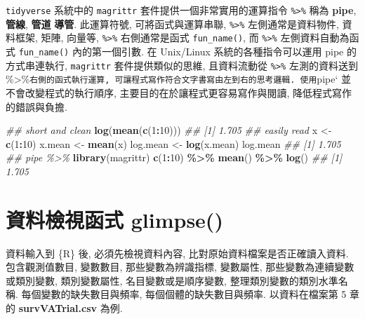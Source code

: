 \documentclass[
]{book}
\newenvironment{Shaded}{\begin{snugshade}}{\end{snugshade}}
\newcommand{\CommentTok}[1]{\textcolor[rgb]{0.56,0.35,0.01}{\textit{#1}}}
\newcommand{\DecValTok}[1]{\textcolor[rgb]{0.00,0.00,0.81}{#1}}
\newcommand{\KeywordTok}[1]{\textcolor[rgb]{0.13,0.29,0.53}{\textbf{#1}}}
\newcommand{\NormalTok}[1]{#1}
\newcommand{\OperatorTok}[1]{\textcolor[rgb]{0.81,0.36,0.00}{\textbf{#1}}}
\newcommand{\StringTok}[1]{\textcolor[rgb]{0.31,0.60,0.02}{#1}}
\begin{document}
\texttt{tidyverse} 系統中的 \texttt{magrittr} 套件提供一個非常實用的運算指令
\texttt{\%\textgreater{}\%} 稱為 \textbf{pipe}, \textbf{管線}, \textbf{管道} \textbf{導管}.
此運算符號, 可將函式與運算串聯,
\texttt{\%\textgreater{}\%} 左側通常是資料物件, 資料框架, 矩陣, 向量等,
\texttt{\%\textgreater{}\%} 右側通常是函式 \texttt{fun\_name()},
而 \texttt{\%\textgreater{}\%} 左側資料自動為函式 \texttt{fun\_name()} 內的第一個引數.
在 Unix/Linux 系統的各種指令可以運用 pipe 的方式串連執行,
\texttt{magrittr} 套件提供類似的思維,
且資料流動從 \texttt{\%\textgreater{}\%} 左測的資料送到 \%\textgreater\%\texttt{右側的函式執行運算,\ 可讓程式寫作符合文字書寫由左到右的思考邏輯.\ 使用}pipe` 並不會改變程式的執行順序,
主要目的在於讓程式更容易寫作與閱讀,
降低程式寫作的錯誤與負擔.

\begin{Shaded}
\begin{Highlighting}[]
\CommentTok{\#\# short and clean }
\KeywordTok{log}\NormalTok{(}\KeywordTok{mean}\NormalTok{(}\KeywordTok{c}\NormalTok{(}\DecValTok{1}\OperatorTok{:}\DecValTok{10}\NormalTok{)))}
\CommentTok{\#\# [1] 1.705}
\CommentTok{\#\# easily read }
\NormalTok{x \textless{}{-}}\StringTok{ }\KeywordTok{c}\NormalTok{(}\DecValTok{1}\OperatorTok{:}\DecValTok{10}\NormalTok{)}
\NormalTok{x.mean \textless{}{-}}\StringTok{ }\KeywordTok{mean}\NormalTok{(x)}
\NormalTok{log.mean \textless{}{-}}\StringTok{ }\KeywordTok{log}\NormalTok{(x.mean)}
\NormalTok{log.mean}
\CommentTok{\#\# [1] 1.705}
\CommentTok{\#\# pipe \%\textgreater{}\%}
\KeywordTok{library}\NormalTok{(magrittr)}
\KeywordTok{c}\NormalTok{(}\DecValTok{1}\OperatorTok{:}\DecValTok{10}\NormalTok{) }\OperatorTok{\%\textgreater{}\%}\StringTok{ }\KeywordTok{mean}\NormalTok{() }\OperatorTok{\%\textgreater{}\%}\StringTok{ }\KeywordTok{log}\NormalTok{()}
\CommentTok{\#\# [1] 1.705}
\end{Highlighting}
\end{Shaded}

\hypertarget{ux8cc7ux6599ux6aa2ux8996ux51fdux5f0f-glimpse}{%
\section{資料檢視函式 glimpse()}\label{ux8cc7ux6599ux6aa2ux8996ux51fdux5f0f-glimpse}}

資料輸入到 \{R\} 後,
必須先檢視資料內容, 比對原始資料檔案是否正確讀入資料.
包含觀測值數目, 變數數目,
那些變數為辨識指標,
變數屬性, 那些變數為連續變數或類別變數,
類別變數屬性, 名目變數或是順序變數,
整理類別變數的類別水準名稱.
每個變數的缺失數目與頻率,
每個個體的缺失數目與頻率.
以資料在檔案第 5 章的 \textbf{survVATrial.csv} 為例.
\end{document}

